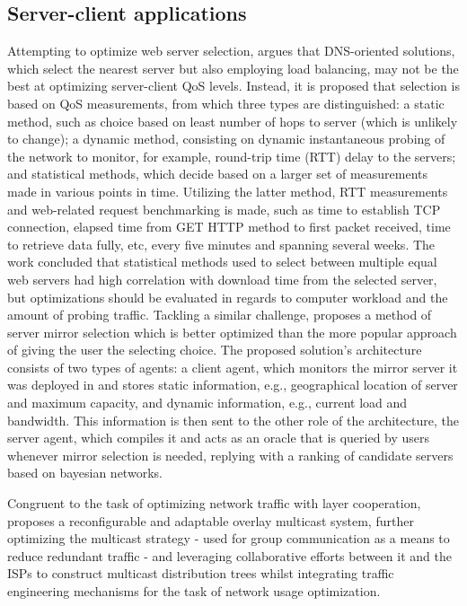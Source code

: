         \subsection{Server-client applications}

        Attempting to optimize web server selection, \cite{kenichi} argues that DNS-oriented solutions, which select the nearest server but also employing load balancing, may not be the best at optimizing server-client QoS levels.
        Instead, it is proposed that selection is based on QoS measurements, from which three types are distinguished: a static method, such as choice based on least number of hops to server (which is unlikely to change); a dynamic method, consisting on dynamic instantaneous probing of the network to monitor, for example, round-trip time (RTT) delay to the servers; and statistical methods, which decide based on a larger set of measurements made in various points in time.
        Utilizing the latter method, RTT measurements and web-related request benchmarking is made, such as time to establish TCP connection, elapsed time from GET HTTP method to first packet received, time to retrieve data fully, etc, every five minutes and spanning several weeks.
        The work concluded that statistical methods used to select between multiple equal web servers had high correlation with download time from the selected server, but optimizations should be evaluated in regards to computer workload and the amount of probing traffic.
        Tackling a similar challenge, \cite{swain} proposes a method of server mirror selection which is better optimized than the more popular approach of giving the user the selecting choice.
        The proposed solution's architecture consists of two types of agents: a client agent, which monitors the mirror server it was deployed in and stores static information, e.g., geographical location of server and maximum capacity, and dynamic information, e.g., current load and bandwidth.
        This information is then sent to the other role of the architecture, the server agent, which compiles it and acts as an oracle that is queried by users whenever mirror selection is needed, replying with a ranking of candidate servers based on bayesian networks.

        Congruent to the task of optimizing network traffic with layer cooperation, \cite{adaptable-overlay} proposes a reconfigurable and adaptable overlay multicast system, further optimizing the multicast strategy - used for group communication as a means to reduce redundant traffic - and leveraging collaborative efforts between it and the ISPs to construct multicast distribution trees whilst integrating traffic engineering mechanisms for the task of network usage optimization.

